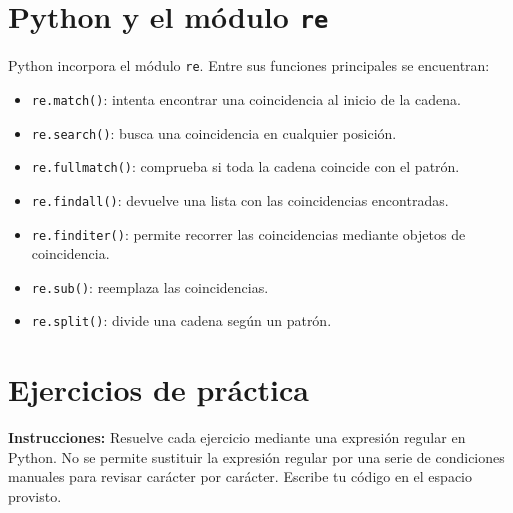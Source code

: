 \documentclass[12pt]{article}
\begin{document}
{\section{Python y el módulo \texttt{re}}
Python incorpora el módulo \texttt{re}. Entre sus funciones principales se encuentran:
\begin{itemize}
\item \texttt{re.match()}: intenta encontrar una coincidencia al inicio de la cadena.
\item \texttt{re.search()}: busca una coincidencia en cualquier posición.
\item \texttt{re.fullmatch()}: comprueba si toda la cadena coincide con el patrón.
\item \texttt{re.findall()}: devuelve una lista con las coincidencias encontradas.
\item \texttt{re.finditer()}: permite recorrer las coincidencias mediante objetos de coincidencia.
\item \texttt{re.sub()}: reemplaza las coincidencias.
\item \texttt{re.split()}: divide una cadena según un patrón.
\end{itemize}

\section{Ejercicios de práctica}
 \textbf{Instrucciones:} Resuelve cada ejercicio mediante una expresión regular en Python. No se permite sustituir la expresión regular por una serie de condiciones manuales para revisar carácter por carácter. Escribe tu código en el espacio provisto.

}
\end{document}
